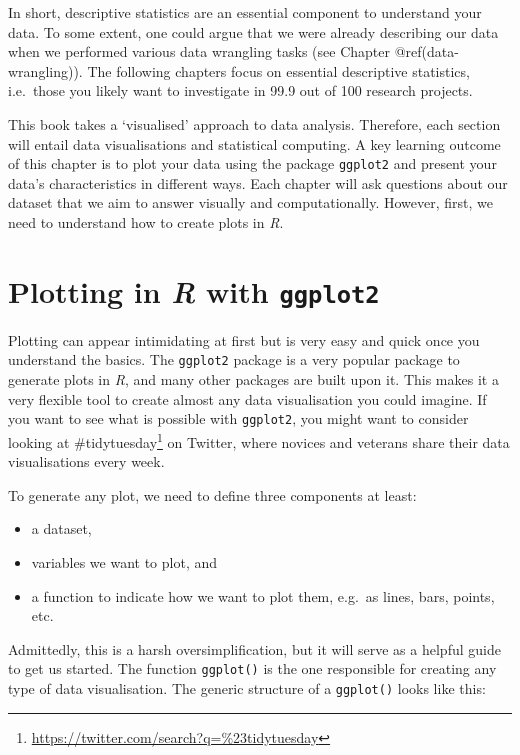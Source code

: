 \documentclass[
  letterpaper,
]{krantz}
\renewcommand{\href}[2]{#2\footnote{\url{#1}}}
\begin{document}
In short, descriptive statistics are an essential component to
understand your data. To some extent, one could argue that we were
already describing our data when we performed various data wrangling
tasks (see Chapter @ref(data-wrangling)). The following chapters focus
on essential descriptive statistics, i.e.~those you likely want to
investigate in 99.9 out of 100 research projects.

This book takes a `visualised' approach to data analysis. Therefore,
each section will entail data visualisations and statistical computing.
A key learning outcome of this chapter is to plot your data using the
package \texttt{ggplot2} and present your data's characteristics in
different ways. Each chapter will ask questions about our dataset that
we aim to answer visually and computationally. However, first, we need
to understand how to create plots in \emph{R}.

\section{\texorpdfstring{Plotting in \emph{R} with
\texttt{ggplot2}}{Plotting in R with ggplot2}}\label{plotting-in-r-with-ggplot2}

Plotting can appear intimidating at first but is very easy and quick
once you understand the basics. The \texttt{ggplot2} package is a very
popular package to generate plots in \emph{R}, and many other packages
are built upon it. This makes it a very flexible tool to create almost
any data visualisation you could imagine. If you want to see what is
possible with \texttt{ggplot2}, you might want to consider looking at
\href{https://twitter.com/search?q=\%23tidytuesday}{\#tidytuesday} on
Twitter, where novices and veterans share their data visualisations
every week.

To generate any plot, we need to define three components at least:

\begin{itemize}
\item
  a dataset,
\item
  variables we want to plot, and
\item
  a function to indicate how we want to plot them, e.g.~as lines, bars,
  points, etc.
\end{itemize}

Admittedly, this is a harsh oversimplification, but it will serve as a
helpful guide to get us started. The function \texttt{ggplot()} is the
one responsible for creating any type of data visualisation. The generic
structure of a \texttt{ggplot()} looks like this:
\end{document}
